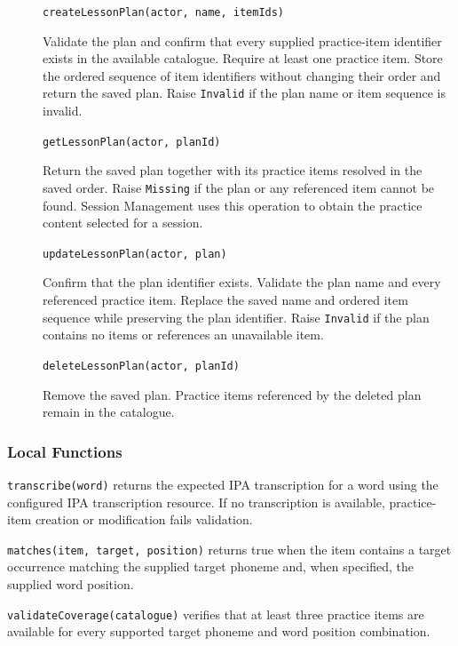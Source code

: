 \documentclass[12pt, titlepage]{article}
\begin{document}
\begin{description}
\item[] \texttt{createLessonPlan(actor, name, itemIds)}\par
Validate the plan and confirm that every supplied practice-item
identifier exists in the available catalogue. Require at least one practice
item. Store the ordered sequence of item identifiers without changing their
order and return the saved plan. Raise \texttt{Invalid} if the plan name
or item sequence is invalid.

\item[] \texttt{getLessonPlan(actor, planId)}\par
Return the saved plan together with its practice items resolved in the
saved order. Raise \texttt{Missing} if the plan or any referenced item
cannot be found. Session Management uses this operation to obtain the
practice content selected for a session.

\item[] \texttt{updateLessonPlan(actor, plan)}\par
Confirm that the plan identifier exists. Validate the plan name and every
referenced practice item. Replace the saved name and ordered item sequence
while preserving the plan identifier. Raise \texttt{Invalid} if the plan
contains no items or references an unavailable item.

\item[] \texttt{deleteLessonPlan(actor, planId)}\par
Remove the saved plan. Practice items referenced by the deleted plan
remain in the catalogue.
\end{description}

\subsubsection{Local Functions}

\texttt{transcribe(word)} returns the expected IPA transcription for a word
using the configured IPA transcription resource. If no transcription is
available, practice-item creation or modification fails validation.

\noindent\texttt{matches(item, target, position)} returns true when the item
contains a target occurrence matching the supplied target phoneme and, when
specified, the supplied word position.

\noindent\texttt{validateCoverage(catalogue)} verifies that at least three
practice items are available for every supported target phoneme and word
position combination.
\end{document}
